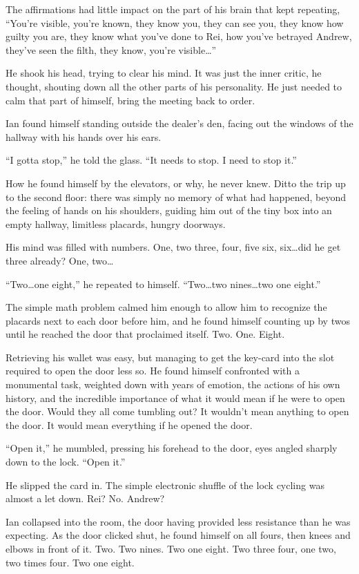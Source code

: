 The affirmations had little impact on the part of his brain that kept repeating, ``You're visible, you're known, they know you, they can see you, they know how guilty you are, they know what you've done to Rei, how you've betrayed Andrew, they've seen the filth, they know, you're visible\ldots{}''

He shook his head, trying to clear his mind. It was just the inner critic, he thought, shouting down all the other parts of his personality. He just needed to calm that part of himself, bring the meeting back to order.

Ian found himself standing outside the dealer's den, facing out the windows of the hallway with his hands over his ears.

``I gotta stop,'' he told the glass. ``It needs to stop. I need to stop it.''

How he found himself by the elevators, or why, he never knew. Ditto the trip up to the second floor: there was simply no memory of what had happened, beyond the feeling of hands on his shoulders, guiding him out of the tiny box into an empty hallway, limitless placards, hungry doorways.

His mind was filled with numbers. One, two three, four, five six, six\ldots{}did he get three already? One, two\ldots{}

``Two\ldots{}one eight,'' he repeated to himself. ``Two\ldots{}two nines\ldots{}two one eight.''

The simple math problem calmed him enough to allow him to recognize the placards next to each door before him, and he found himself counting up by twos until he reached the door that proclaimed itself. Two. One. Eight.

Retrieving his wallet was easy, but managing to get the key-card into the slot required to open the door less so. He found himself confronted with a monumental task, weighted down with years of emotion, the actions of his own history, and the incredible importance of what it would mean if he were to open the door. Would they all come tumbling out? It wouldn't mean anything to open the door. It would mean everything if he opened the door.

``Open it,'' he mumbled, pressing his forehead to the door, eyes angled sharply down to the lock. ``Open it.''

He slipped the card in. The simple electronic shuffle of the lock cycling was almost a let down. Rei? No. Andrew?

Ian collapsed into the room, the door having provided less resistance than he was expecting. As the door clicked shut, he found himself on all fours, then knees and elbows in front of it. Two. Two nines. Two one eight. Two three four, one two, two times four. Two one eight.

